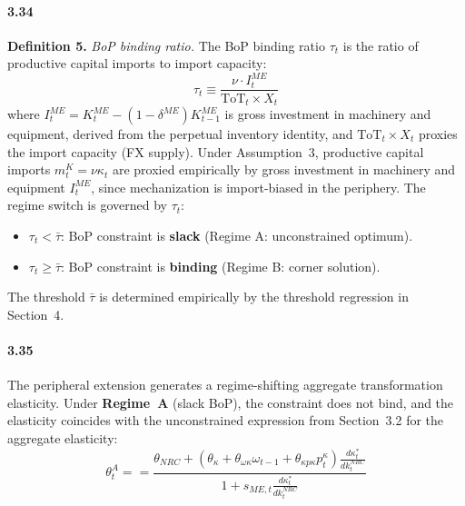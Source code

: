 \paragraph{3.34}
\textbf{Definition 5.} \textit{BoP binding ratio.} The BoP
binding ratio $\tau_t$ is the ratio of productive capital
imports to import capacity:
\begin{equation}
	\tau_t \equiv \frac{\nu \cdot I^{ME}_t}
	{\text{ToT}_t \times X_t}
	\label{eq:33:tau}
\end{equation}
where $I^{ME}_t = K^{ME}_t - (1-\delta^{ME}) K^{ME}_{t-1}$
is gross investment in machinery and equipment, derived from
the perpetual inventory identity, and $\text{ToT}_t \times X_t$
proxies the import capacity (FX supply). Under Assumption~3,
productive capital imports $m^K_t = \nu \kappa_t$ are proxied
empirically by gross investment in machinery and equipment
$I^{ME}_t$, since mechanization is import-biased in the
periphery. The regime switch is governed by $\tau_t$:
\begin{itemize}
	\item $\tau_t < \bar{\tau}$: BoP constraint is
	\textbf{slack} (Regime A: unconstrained optimum).
	\item $\tau_t \ge \bar{\tau}$: BoP constraint is
	\textbf{binding} (Regime B: corner solution).
\end{itemize}
The threshold $\bar{\tau}$ is determined empirically by the
threshold regression in Section~4.

\paragraph{3.35}
The peripheral extension generates a regime-shifting
aggregate transformation elasticity. Under \textbf{Regime~A}
(slack BoP), the constraint does not bind, and the
elasticity coincides with the unconstrained expression from
Section~3.2 for the aggregate elasticity:
\begin{equation}
	\theta^{A}_t = 
	= \frac{\theta_{NRC}
		+ \left(\theta_\kappa + \theta_{\omega\kappa}\omega_{t-1}
		+ \theta_{\kappa p\kappa} p^\kappa_t\right)
		\frac{d\kappa_t^*}{dk^{NRC}_t}}
	{1 + s_{ME,t}\frac{d\kappa_t^*}{dk^{NRC}_t}}
	\label{eq:33:theta_A}
\end{equation}

